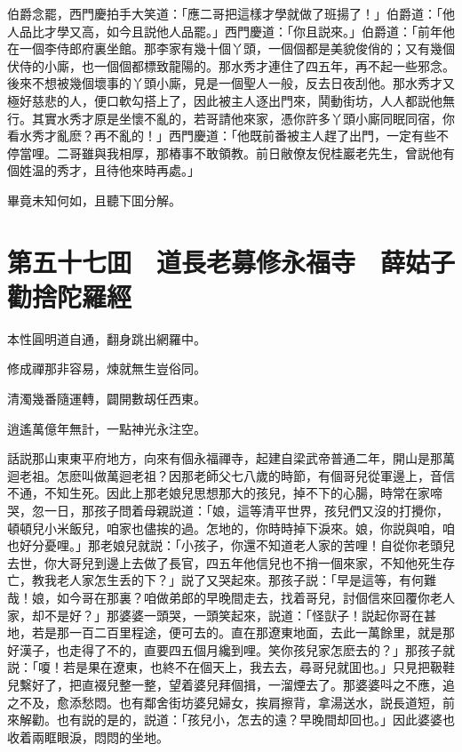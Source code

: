 伯爵念罷，西門慶拍手大笑道：「應二哥把這樣才學就做了班揚了！」伯爵道：「他人品比才學又高，如今且説他人品罷。」西門慶道：「你且説來。」伯爵道：「前年他在一個李侍郎府裏坐館。那李家有幾十個丫頭，一個個都是美貌俊俏的；又有幾個伏侍的小廝，也一個個都標致龍陽的。那水秀才連住了四五年，再不起一些邪念。後來不想被幾個壞事的丫頭小廝，見是一個聖人一般，反去日夜刮他。那水秀才又極好慈悲的人，便口軟勾搭上了，因此被主人逐出門來，鬨動街坊，人人都説他無行。其實水秀才原是坐懷不亂的，若哥請他來家，憑你許多丫頭小廝同眠同宿，你看水秀才亂麽？再不亂的！」西門慶道：「他既前番被主人趕了出門，一定有些不停當哩。二哥雖與我相厚，那樁事不敢領教。前日敝僚友倪桂巖老先生，曾説他有個姓温的秀才，且待他來時再處。」

畢竟未知何如，且聽下囬分解。

\chapter*{第五十七囬　道長老募修永福寺　薛姑子勸捨陀羅經}

本性圓明道自通，翻身跳出網羅中。

修成禪那非容易，煉就無生豈俗同。

清濁幾番隨運轉，闢開數刼任西東。

逍遙萬億年無計，一點神光永注空。

話説那山東東平府地方，向來有個永福禪寺，起建自梁武帝普通二年，開山是那萬迴老祖。怎麽叫做萬迴老祖？因那老師父七八歲的時節，有個哥兒從軍邊上，音信不通，不知生死。因此上那老娘兒思想那大的孩兒，掉不下的心腸，時常在家啼哭，忽一日，那孩子問着母親説道：「娘，這等清平世界，孩兒們又沒的打攪你，頓頓兒小米飯兒，咱家也儘挨的過。怎地的，你時時掉下淚來。娘，你説與咱，咱也好分憂哩。」那老娘兒就説：「小孩子，你還不知道老人家的苦哩！自從你老頭兒去世，你大哥兒到邊上去做了長官，四五年他信兒也不捎一個來家，不知他死生存亡，教我老人家怎生丢的下？」説了又哭起來。那孩子説：「早是這等，有何難哉！娘，如今哥在那裏？咱做弟郎的早晚間走去，找着哥兒，討個信來回覆你老人家，却不是好？」那婆婆一頭哭，一頭笑起來，説道：「怪獃子！説起你哥在甚地，若是那一百二百里程途，便可去的。直在那遼東地面，去此一萬餘里，就是那好漢子，也走得了不的，直要四五個月纔到哩。笑你孩兒家怎麽去的？」那孩子就説：「嗄！若是果在遼東，也終不在個天上，我去去，尋哥兒就囬也。」只見把靸鞋兒繫好了，把直裰兒整一整，望着婆兒拜個揖，一溜煙去了。那婆婆呌之不應，追之不及，愈添愁悶。也有鄰舍街坊婆兒婦女，挨肩擦背，拿湯送水，説長道短，前來解勸。也有説的是的，説道：「孩兒小，怎去的遠？早晚間却回也。」因此婆婆也收着兩眶眼淚，悶悶的坐地。

